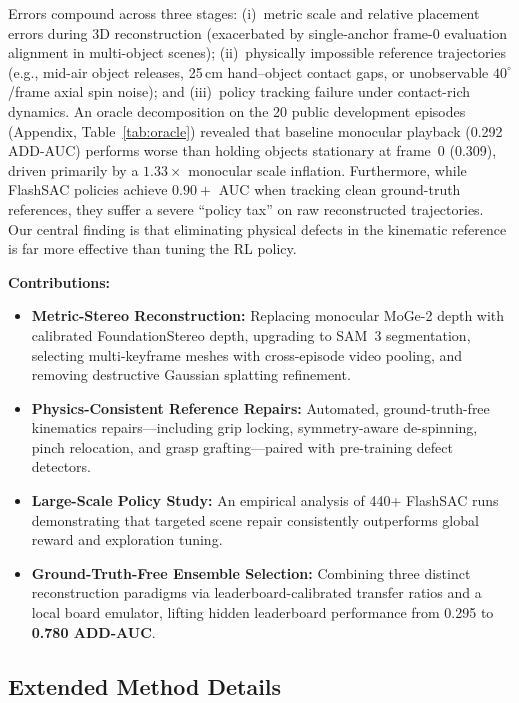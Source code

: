 \documentclass[10pt]{nvidiaextabstract}
\begin{document}
Errors compound across three stages: (i)~metric scale and relative placement errors during 3D reconstruction (exacerbated by single-anchor frame-0 evaluation alignment in multi-object scenes); (ii)~physically impossible reference trajectories (e.g., mid-air object releases, 25\,cm hand--object contact gaps, or unobservable $40^\circ$/frame axial spin noise); and (iii)~policy tracking failure under contact-rich dynamics. An oracle decomposition on the 20 public development episodes (Appendix, Table~\ref{tab:oracle}) revealed that baseline monocular playback (0.292 ADD-AUC) performs worse than holding objects stationary at frame~0 (0.309), driven primarily by a $1.33\times$ monocular scale inflation. Furthermore, while FlashSAC policies achieve $0.90+$ AUC when tracking clean ground-truth references, they suffer a severe ``policy tax'' on raw reconstructed trajectories. Our central finding is that eliminating physical defects in the kinematic reference is far more effective than tuning the RL policy.

\textbf{Contributions:}
\begin{itemize}\setlength{\itemsep}{1pt}\setlength{\parskip}{0pt}
  \item \textbf{Metric-Stereo Reconstruction:} Replacing monocular MoGe-2 depth with calibrated FoundationStereo depth, upgrading to SAM~3 segmentation, selecting multi-keyframe meshes with cross-episode video pooling, and removing destructive Gaussian splatting refinement.
  \item \textbf{Physics-Consistent Reference Repairs:} Automated, ground-truth-free kinematics repairs—including grip locking, symmetry-aware de-spinning, pinch relocation, and grasp grafting—paired with pre-training defect detectors.
  \item \textbf{Large-Scale Policy Study:} An empirical analysis of 440+ FlashSAC runs demonstrating that targeted scene repair consistently outperforms global reward and exploration tuning.
  \item \textbf{Ground-Truth-Free Ensemble Selection:} Combining three distinct reconstruction paradigms via leaderboard-calibrated transfer ratios and a local board emulator, lifting hidden leaderboard performance from 0.295 to \textbf{0.780 ADD-AUC}.
\end{itemize}

\subsection{Extended Method Details}
\label{app:detail-method}
\end{document}
